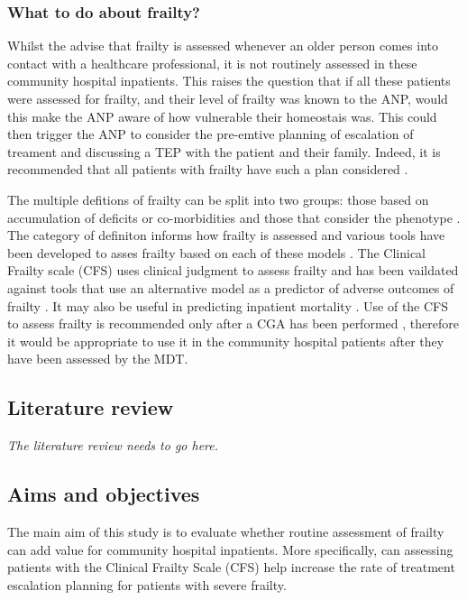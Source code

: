 \documentclass[12pt,a4paper,oneside,titlepage]{article}
\begin{document}
\subsubsection*{What to do about frailty?}

Whilst the \textcite{bgs:14} advise that frailty is assessed whenever an older person
comes into contact with a healthcare professional, it is not routinely assessed 
in these community hospital inpatients. This raises the question that if all these 
patients were assessed for frailty, and their level of frailty was known to the ANP,
would this make the ANP aware of how vulnerable their homeostais was.
This could then trigger the ANP to consider the pre-emtive planning of escalation
of treament and discussing a TEP with the patient and their family. Indeed,
it is recommended that all patients with frailty have such a plan considered
\parencite{bgs:14}.

The multiple defitions of frailty can be split into two groups: those based on accumulation 
of deficits or co-morbidities and those that consider the phenotype \parencite{shamliyan:13}. 
The category of definiton informs how frailty is assessed and various tools have been developed
to asses frailty based on each of these models \parencite{clegg:13}.
The Clinical Frailty scale (CFS) \parencite{dalhousie:15} uses clinical judgment 
to assess frailty and has been vaildated
against tools that use an alternative model as a predictor of adverse outcomes 
of frailty \parencite{rockwood:05}. It may also be useful in predicting
inpatient mortality \parencite{wallis:15}.
Use of the CFS to
assess frailty is recommended only after a CGA has been performed \parencite{bgs:14}, therefore
it would be appropriate to use it in the community hospital patients after they
have been assessed by the MDT.

\subsection*{Literature review}
\emph{The literature review needs to go here.}

\subsection*{Aims and objectives}
The main aim of this study is to evaluate whether routine assessment of
frailty can add value for community hospital inpatients.
More specifically, can assessing patients with the Clinical Frailty Scale (CFS)
help increase the rate of 
treatment escalation planning for patients with severe frailty. 
\end{document}
